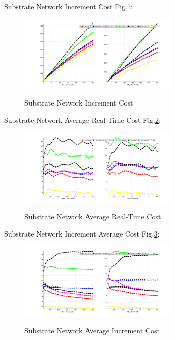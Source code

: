 Substrate Network Increment Cost Fig.\ref{fig:CostAccumulateSubstrateNetwork}:
\begin{figure}[htbp]
  \centering
  \includegraphics[width=3in]{Fig/CostAccumulateSubstrateNetwork}\\
  \caption{Substrate Network Increment Cost}\label{fig:CostAccumulateSubstrateNetwork}
\end{figure}

Substrate Network Average Real-Time  Cost Fig.\ref{fig:CostCurrentAverageSubstrateNetwork}:
\begin{figure}[htbp]
  \centering
  \includegraphics[width=3in]{Fig/CostCurrentAverageSubstrateNetwork}\\
  \caption{Substrate Network Average Real-Time Cost}\label{fig:CostCurrentAverageSubstrateNetwork}
\end{figure}

Substrate Network Increment Average Cost Fig.\ref{fig:CostAccumulateAverageSubstrateNetwork}:
\begin{figure}[htbp]
  \centering
  \includegraphics[width=3in]{Fig/CostAccumulateAverageSubstrateNetwork}\\
  \caption{Substrate Network Average Increment Cost }\label{fig:CostAccumulateAverageSubstrateNetwork}
\end{figure}



